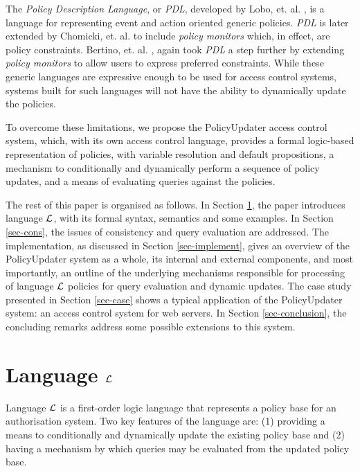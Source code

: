 \documentclass[global,twocolumn,draft]{svjour}
\begin{document}
    The {\em Policy Description Language}, or {\em PDL}, developed by Lobo,
    et. al. \cite{LOB}, is a language for representing event and action
    oriented generic policies. {\em PDL} is later extended by Chomicki, et. al.
    \cite{CHO} to include {\em policy monitors} which, in effect, are policy
    constraints. Bertino, et. al. \cite{BE2}, again took {\em PDL} a step
    further by extending {\em policy monitors} to allow users to express
    preferred constraints. While these generic languages are expressive enough
    to be used for access control systems, systems built for such languages
    will not have the ability to dynamically update the policies.

    To overcome these limitations, we propose the PolicyUpdater access control
    system, which, with its own access control language, provides a formal
    logic-based representation of policies, with variable resolution and
    default propositions, a mechanism to conditionally and dynamically
    perform a sequence of policy updates, and a means of evaluating queries
    against the policies.

    The rest of this paper is organised as follows. In Section \ref{sec-langl},
    the paper introduces language ${\cal L}$, with its formal syntax, semantics
    and some examples. In Section \ref{sec-cons}, the issues of consistency and
    query evaluation are addressed. The implementation, as discussed in Section
    \ref{sec-implement}, gives an overview of the PolicyUpdater system as
    a whole, its internal and external components, and most importantly, an
    outline of the underlying mechanisms responsible for processing of language
    ${\cal L}$ policies for query evaluation and dynamic updates. The case
    study presented in Section \ref{sec-case} shows a typical application of
    the PolicyUpdater system: an access control system for web servers. In
    Section \ref{sec-conclusion}, the concluding remarks address some
    possible extensions to this system.

  \section{Language $\cal{L}$}
    \label{sec-langl}

    Language $\cal{L}$ is a first-order logic language that represents a policy
    base for an authorisation system. Two key features of the language are: (1)
    providing a means to conditionally and dynamically update the existing
    policy base and (2) having a mechanism by which queries may be evaluated
    from the updated policy base.
\end{document}
